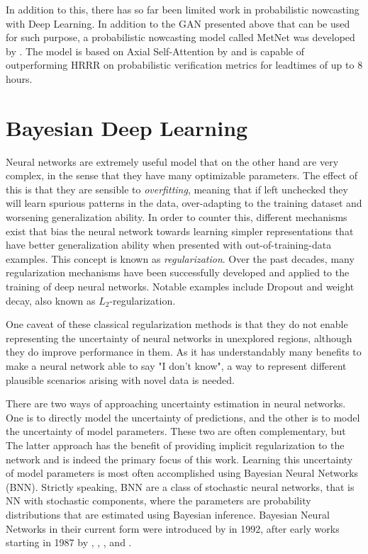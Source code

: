 In addition to this, there has so far been limited work in probabilistic nowcasting with Deep Learning. In addition to the GAN presented above that can be used for such purpose, a probabilistic nowcasting model called MetNet was developed by \citet{sonderby_metnet_2020}. The model is based on Axial Self-Attention by \citet{ho_axial_2019} and is capable of outperforming HRRR on probabilistic verification metrics for leadtimes of up to 8 hours. 
 
\section{Bayesian Deep Learning}
\label{section:bdl_theory}

	Neural networks are extremely useful model that on the other hand are very complex, in the sense that they have many optimizable parameters. The effect of this is that they are sensible to \textit{overfitting}, meaning that if left unchecked they will learn spurious patterns in the data, over-adapting to the training dataset and worsening generalization ability. In order to counter this, different mechanisms exist that bias the neural network towards learning simpler representations that have better generalization ability when presented with out-of-training-data examples. This concept is known as \textit{regularization}. Over the past decades, many regularization mechanisms have been successfully developed and applied to the training of deep neural networks. Notable examples include Dropout and weight decay, also known as $L_2$-regularization. \cite{srivastava2014dropout, bishop2006pattern} 
	
	One caveat of these classical regularization methods is that they do not enable representing the uncertainty of neural networks in unexplored regions, although they do improve performance in them. As it has understandably many benefits to make a neural network able to say "I don't know", a way to represent different plausible scenarios arising with novel data is needed. 
	
	There are two ways of approaching uncertainty estimation in neural networks. One is to directly model the uncertainty of predictions, and the other is to model the uncertainty of model parameters. These two are often complementary, but The latter approach has the benefit of providing implicit regularization to the network and is indeed the primary focus of this work. Learning this uncertainty of model parameters is most often accomplished using Bayesian Neural Networks (BNN). Strictly speaking, BNN are a class of stochastic neural networks, that is NN with stochastic components, where the parameters are probability distributions that are estimated using Bayesian inference. Bayesian Neural Networks in their current form were introduced by \citet{mackay1992practical} in 1992, after early works starting in 1987 by \citet{denker1987large}, \citet{tishby_consistent_1989}, \citet{denker_transforming_1990}, and \citet{buntine1991bayesian}. 
	
